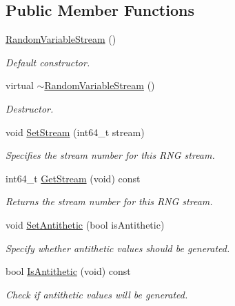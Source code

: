 \subsection*{Public Member Functions}
\begin{DoxyCompactItemize}
\item 
\hyperlink{classns3_1_1RandomVariableStream_ab6dd72fd15a0043b678ff56ac326b233}{Random\+Variable\+Stream} ()
\begin{DoxyCompactList}\small\item\em Default constructor. \end{DoxyCompactList}\item 
virtual \hyperlink{classns3_1_1RandomVariableStream_a2786aa6615f53202dfc8a0c1fad62250}{$\sim$\+Random\+Variable\+Stream} ()
\begin{DoxyCompactList}\small\item\em Destructor. \end{DoxyCompactList}\item 
void \hyperlink{classns3_1_1RandomVariableStream_add11aaf975607746b7e271d300659a94}{Set\+Stream} (int64\+\_\+t stream)
\begin{DoxyCompactList}\small\item\em Specifies the stream number for this R\+NG stream. \end{DoxyCompactList}\item 
int64\+\_\+t \hyperlink{classns3_1_1RandomVariableStream_a05b8b4ffd88d402156fed980018e7a56}{Get\+Stream} (void) const 
\begin{DoxyCompactList}\small\item\em Returns the stream number for this R\+NG stream. \end{DoxyCompactList}\item 
void \hyperlink{classns3_1_1RandomVariableStream_ab27522a091c67b9e38c9b4716a1c1c5c}{Set\+Antithetic} (bool is\+Antithetic)
\begin{DoxyCompactList}\small\item\em Specify whether antithetic values should be generated. \end{DoxyCompactList}\item 
bool \hyperlink{classns3_1_1RandomVariableStream_a7bf5175d624b14bd023f8c4f78bc5fd7}{Is\+Antithetic} (void) const 
\begin{DoxyCompactList}\small\item\em Check if antithetic values will be generated. \end{DoxyCompactList}\item 

\end{DoxyCompactItemize}
